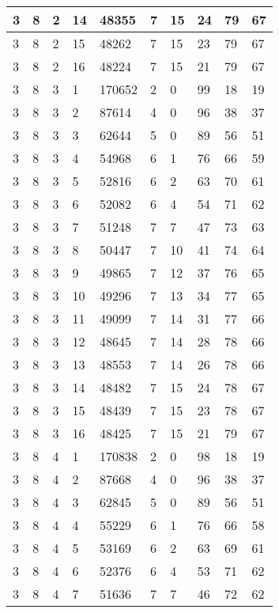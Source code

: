 \begin{table}[!ht]
\begin{tabular}{|l|l|l|l|l|l|l|l|l|l|}
        3 & 8 & 2 & 14 & 48355 & 7 & 15 & 24 & 79 & 67 \\ \hline
        3 & 8 & 2 & 15 & 48262 & 7 & 15 & 23 & 79 & 67 \\ \hline
        3 & 8 & 2 & 16 & 48224 & 7 & 15 & 21 & 79 & 67 \\ \hline
        3 & 8 & 3 & 1 & 170652 & 2 & 0 & 99 & 18 & 19 \\ \hline
        3 & 8 & 3 & 2 & 87614 & 4 & 0 & 96 & 38 & 37 \\ \hline
        3 & 8 & 3 & 3 & 62644 & 5 & 0 & 89 & 56 & 51 \\ \hline
        3 & 8 & 3 & 4 & 54968 & 6 & 1 & 76 & 66 & 59 \\ \hline
        3 & 8 & 3 & 5 & 52816 & 6 & 2 & 63 & 70 & 61 \\ \hline
        3 & 8 & 3 & 6 & 52082 & 6 & 4 & 54 & 71 & 62 \\ \hline
        3 & 8 & 3 & 7 & 51248 & 7 & 7 & 47 & 73 & 63 \\ \hline
        3 & 8 & 3 & 8 & 50447 & 7 & 10 & 41 & 74 & 64 \\ \hline
        3 & 8 & 3 & 9 & 49865 & 7 & 12 & 37 & 76 & 65 \\ \hline
        3 & 8 & 3 & 10 & 49296 & 7 & 13 & 34 & 77 & 65 \\ \hline
        3 & 8 & 3 & 11 & 49099 & 7 & 14 & 31 & 77 & 66 \\ \hline
        3 & 8 & 3 & 12 & 48645 & 7 & 14 & 28 & 78 & 66 \\ \hline
        3 & 8 & 3 & 13 & 48553 & 7 & 14 & 26 & 78 & 66 \\ \hline
        3 & 8 & 3 & 14 & 48482 & 7 & 15 & 24 & 78 & 67 \\ \hline
        3 & 8 & 3 & 15 & 48439 & 7 & 15 & 23 & 78 & 67 \\ \hline
        3 & 8 & 3 & 16 & 48425 & 7 & 15 & 21 & 79 & 67 \\ \hline
        3 & 8 & 4 & 1 & 170838 & 2 & 0 & 98 & 18 & 19 \\ \hline
        3 & 8 & 4 & 2 & 87668 & 4 & 0 & 96 & 38 & 37 \\ \hline
        3 & 8 & 4 & 3 & 62845 & 5 & 0 & 89 & 56 & 51 \\ \hline
        3 & 8 & 4 & 4 & 55229 & 6 & 1 & 76 & 66 & 58 \\ \hline
        3 & 8 & 4 & 5 & 53169 & 6 & 2 & 63 & 69 & 61 \\ \hline
        3 & 8 & 4 & 6 & 52376 & 6 & 4 & 53 & 71 & 62 \\ \hline
        3 & 8 & 4 & 7 & 51636 & 7 & 7 & 46 & 72 & 62 \\ \hline

\end{tabular}
\end{table}
